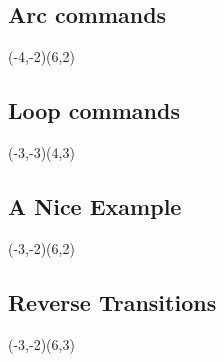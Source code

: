 \subsection{Arc commands}
\begin{VCPicture}{(-4,-2)(6,2)}

  
   
  
    
   
  
     
\end{VCPicture}


\subsection{Loop commands}
\begin{VCPicture}{(-3,-3)(4,3)}
 

   
   
         
\end{VCPicture}



\subsection{A Nice Example}
\begin{VCPicture}{(-3,-2)(6,2)}

  

 

  
  
 
                   
\end{VCPicture}


\subsection{Reverse Transitions}
\begin{VCPicture}{(-3,-2)(6,3)}
               
  

   
   
\ReverseArrow
{} 
  
\end{VCPicture}

